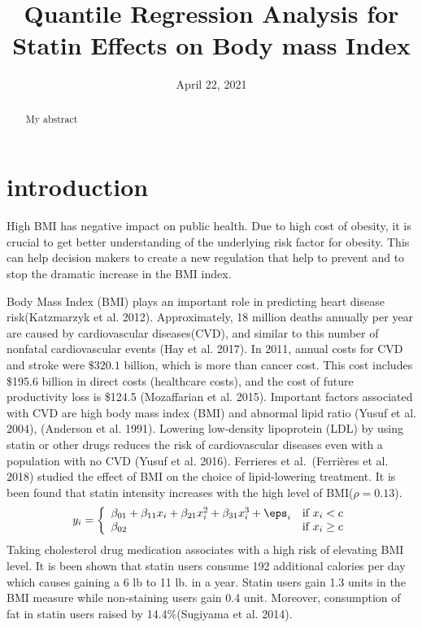 \documentclass[
  12pt,
]{article}
\title{Quantile Regression Analysis for Statin Effects on Body mass Index}
\author{}
\date{\vspace{-2.5em}April 22, 2021}
\begin{document}
\maketitle
\begin{abstract}
My abstract
\end{abstract}

{
\setcounter{tocdepth}{2}
\tableofcontents
}
\section{introduction}

High BMI has negative impact on public health. Due to high cost of obesity, it is crucial to get better understanding of the underlying risk factor for obesity. This can help decision makers to create a new regulation that help to prevent and to stop the dramatic increase in the BMI index.

Body Mass Index (BMI) plays an important role in predicting heart disease risk(Katzmarzyk et al. 2012). Approximately, 18 million deaths annually per year are caused by cardiovascular diseases(CVD), and similar to this number of nonfatal cardiovascular events (Hay et al. 2017).
In 2011, annual costs for CVD and stroke were \(\$320.1\) billion, which is more than cancer cost. This cost includes \$195.6 billion in direct costs (healthcare costs), and the cost of future productivity loss is \$124.5 (Mozaffarian et al. 2015). Important factors associated with CVD are high body mass index (BMI) and abnormal lipid ratio (Yusuf et al. 2004), (Anderson et al. 1991). Lowering low-density lipoprotein (LDL) by using statin or other drugs reduces the risk of cardiovascular diseases even with a population with no CVD (Yusuf et al. 2016). Ferrieres et al.~(Ferrières et al. 2018) studied the effect of BMI on the choice of lipid-lowering treatment. It is been found that statin intensity increases with the high level of BMI(\(\rho=0.13\)).
\begin{equation}
y_{i}=  
 \left\{
\begin{array}{ll}
 \beta_{01}+\beta_{11}x_i+\beta_{21}x_i^2+ \beta_{31}x_i^3+\eps_i & \mbox{if } x_i< c \\
 \beta_{02} & \mbox{if } x_i \geq c
\end{array}
\right.
\end{equation}
Taking cholesterol drug medication associates with a high risk of elevating BMI level. It is been shown that statin users consume 192 additional calories per day which causes gaining a 6 lb to 11 lb. in a year. Statin users gain 1.3 units in the BMI measure while non-staining users gain 0.4 unit. Moreover, consumption of fat in statin users raised by 14.4\%(Sugiyama et al. 2014).
\end{document}
